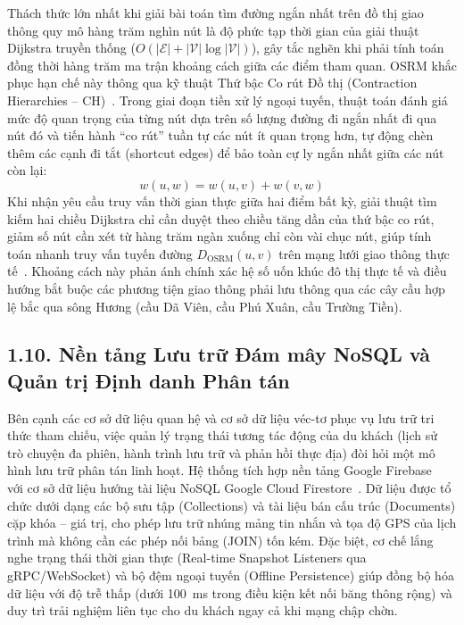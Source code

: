 Thách thức lớn nhất khi giải bài toán tìm đường ngắn nhất trên đồ thị giao thông quy mô hàng trăm nghìn nút là độ phức tạp thời gian của giải thuật Dijkstra truyền thống ($O(|\mathcal{E}| + |\mathcal{V}|\log|\mathcal{V}|)$), gây tắc nghẽn khi phải tính toán đồng thời hàng trăm ma trận khoảng cách giữa các điểm tham quan. OSRM khắc phục hạn chế này thông qua kỹ thuật Thứ bậc Co rút Đồ thị (Contraction Hierarchies -- CH)~\cite{geisberger2008contraction}. Trong giai đoạn tiền xử lý ngoại tuyến, thuật toán đánh giá mức độ quan trọng của từng nút dựa trên số lượng đường đi ngắn nhất đi qua nút đó và tiến hành ``co rút'' tuần tự các nút ít quan trọng hơn, tự động chèn thêm các cạnh đi tắt (shortcut edges) để bảo toàn cự ly ngắn nhất giữa các nút còn lại:
\begin{equation}
    w(u, w) = w(u, v) + w(v, w)
    \label{eq:ch-shortcut}
\end{equation}
Khi nhận yêu cầu truy vấn thời gian thực giữa hai điểm bất kỳ, giải thuật tìm kiếm hai chiều Dijkstra chỉ cần duyệt theo chiều tăng dần của thứ bậc co rút, giảm số nút cần xét từ hàng trăm ngàn xuống chỉ còn vài chục nút, giúp tính toán nhanh truy vấn tuyến đường $D_{\text{OSRM}}(u, v)$ trên mạng lưới giao thông thực tế~\cite{luxen2011osrm}. Khoảng cách này phản ánh chính xác hệ số uốn khúc đô thị thực tế và điều hướng bắt buộc các phương tiện giao thông phải lưu thông qua các cây cầu hợp lệ bắc qua sông Hương (cầu Dã Viên, cầu Phú Xuân, cầu Trường Tiền).

\subsection*{1.10. Nền tảng Lưu trữ Đám mây NoSQL và Quản trị Định danh Phân tán}
{}

Bên cạnh các cơ sở dữ liệu quan hệ và cơ sở dữ liệu véc-tơ phục vụ lưu trữ tri thức tham chiếu, việc quản lý trạng thái tương tác động của du khách (lịch sử trò chuyện đa phiên, hành trình lưu trữ và phản hồi thực địa) đòi hỏi một mô hình lưu trữ phân tán linh hoạt. Hệ thống tích hợp nền tảng Google Firebase~\cite{moroney2017firebase} với cơ sở dữ liệu hướng tài liệu NoSQL Google Cloud Firestore~\cite{davoudian2018nosql, google2024firestore}. Dữ liệu được tổ chức dưới dạng các bộ sưu tập (Collections) và tài liệu bán cấu trúc (Documents) cặp khóa -- giá trị, cho phép lưu trữ nhúng mảng tin nhắn và tọa độ GPS của lịch trình mà không cần các phép nối bảng (JOIN) tốn kém. Đặc biệt, cơ chế lắng nghe trạng thái thời gian thực (Real-time Snapshot Listeners qua gRPC/WebSocket) và bộ đệm ngoại tuyến (Offline Persistence) giúp đồng bộ hóa dữ liệu với độ trễ thấp (dưới 100~ms trong điều kiện kết nối băng thông rộng) và duy trì trải nghiệm liên tục cho du khách ngay cả khi mạng chập chờn.


